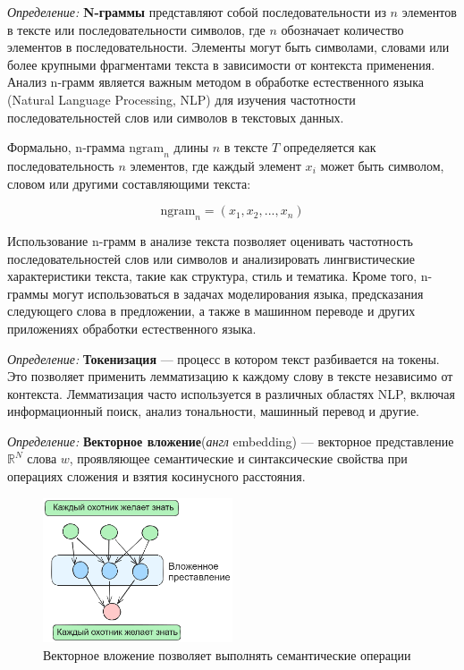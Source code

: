 \textit{Определение:} \textbf{N-граммы} представляют собой последовательности из \( n \) элементов в тексте или последовательности символов, 
где \( n \) обозначает количество элементов в последовательности. Элементы могут быть символами, словами или более крупными фрагментами текста 
в зависимости от контекста применения. Анализ n-грамм является важным методом в обработке естественного языка (Natural Language Processing, NLP) 
для изучения частотности последовательностей слов или символов в текстовых данных.

Формально, n-грамма \( \text{ngram}_n \) длины \( n \) в тексте \( T \) определяется как последовательность \( n \) элементов, 
где каждый элемент \( x_i \) может быть символом, словом или другими составляющими текста:

\[ \text{ngram}_n = (x_1, x_2, ..., x_n) \]

Использование n-грамм в анализе текста позволяет оценивать частотность последовательностей слов или символов и анализировать лингвистические характеристики
 текста, такие как структура, стиль и тематика. Кроме того, n-граммы могут использоваться в задачах моделирования языка, предсказания следующего слова в предложении, 
 а также в машинном переводе и других приложениях обработки естественного языка.

\textit{Определение:} \textbf{Токенизация} --- процесс в котором текст разбивается на токены. 
Это позволяет применить лемматизацию к каждому слову в тексте независимо от контекста.
Лемматизация часто используется в различных областях NLP, включая информационный поиск, анализ тональности, машинный перевод и другие.

\textit{Определение:} \textbf{Векторное вложение}(\textit{англ} embedding) --- векторное представление $\mathbb{R}^N$ слова $w$,
проявляющее семантические и синтаксические свойства при операциях сложения и взятия косинусного расстояния.

\begin{figure}[h]
    \centering
    \includegraphics[width=0.5\textwidth]{assets/ml/nlp/word2vec.excalidraw.png}
    \caption{Векторное вложение позволяет выполнять семантические операции}
    \label{word2vec}
\end{figure}

